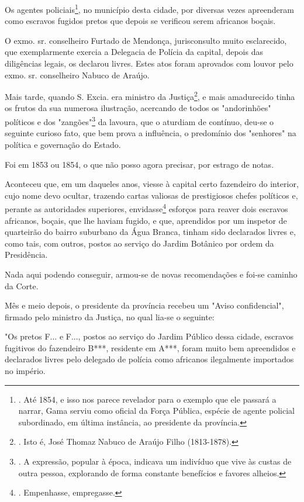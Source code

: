 Os agentes policiais\footnote{. Até 1854, e isso nos parece revelador
  para o exemplo que ele passará a narrar, Gama serviu como oficial da
  Força Pública, espécie de agente policial subordinado, em última
  instância, ao presidente da província.}, no município desta cidade,
por diversas vezes apreenderam como escravos fugidos pretos que depois
se verificou serem africanos boçais.

O exmo. sr. conselheiro Furtado de Mendonça, jurisconsulto muito
esclarecido, que exemplarmente exercia a Delegacia de Polícia da
capital, depois das diligências legais, os declarou livres. Estes atos
foram aprovados com louvor pelo exmo. sr. conselheiro Nabuco de Araújo.

Mais tarde, quando S. Excia. era ministro da Justiça\footnote{. Isto é,
  José Thomaz Nabuco de Araújo Filho (1813-1878).}, e mais amadurecido
tinha os frutos da sua numerosa ilustração, acercando de todos os
"andorinhões" políticos e dos "zangões"\footnote{. A expressão, popular
  à época, indicava um indivíduo que vive às custas de outra pessoa,
  explorando de forma constante benefícios e favores alheios.} da
lavoura, que o aturdiam de contínuo, deu-se o seguinte curioso fato, que
bem prova a influência, o predomínio dos "senhores" na política e
governação do Estado.

Foi em 1853 ou 1854, o que não posso agora precisar, por estrago de
notas.

Aconteceu que, em um daqueles anos, viesse à capital certo fazendeiro do
interior, cujo nome devo ocultar, trazendo cartas valiosas de
prestigiosos chefes políticos e, perante as autoridades superiores,
envidasse\footnote{. Empenhasse, empregasse.} esforços para reaver dois
escravos africanos, boçais, que lhe haviam fugido, e que, aprendidos por
um inspetor de quarteirão do bairro suburbano da Água Branca, tinham
sido declarados livres e, como tais, com outros, postos ao serviço do
Jardim Botânico por ordem da Presidência.

Nada aqui podendo conseguir, armou-se de novas recomendações e foi-se
caminho da Corte.

Mês e meio depois, o presidente da província recebeu um "Aviso
confidencial", firmado pelo ministro da Justiça, no qual lia-se o
seguinte:

"Os pretos F... e F..., postos ao serviço do Jardim Público dessa
cidade, escravos fugitivos do fazendeiro B***, residente em A***, foram
muito bem apreendidos e declarados livres pelo delegado de polícia como
africanos ilegalmente importados no império.

